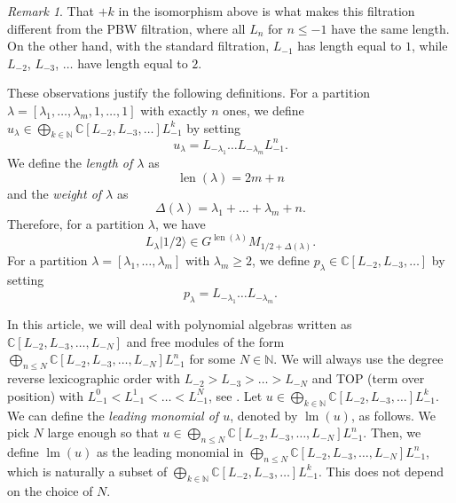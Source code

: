 \documentclass[a4paper, 12pt, reqno]{amsart}
\theoremstyle{remark}
\newtheorem{remark}[theorem]{Remark}
\DeclareMathOperator{\lm}{lm}
\DeclareMathOperator{\len}{len}
\newcommand{\vachalf}{{|1/2\rangle}}
\begin{document}
\begin{remark}
  \label{rmk:4}
  That $+k$ in the isomorphism above is what makes this filtration different from the PBW filtration, where all $L_n$ for $n \le -1$ have the same length.
  On the other hand, with the standard filtration, $L_{-1}$ has length equal to $1$, while $L_{-2}$, $L_{-3}$, $\dots$ have length equal to $2$.
\end{remark}

These observations justify the following definitions.
For a partition $\lambda = [\lambda_1, \dots, \lambda_m, 1, \dots, 1]$ with exactly $n$ ones, we define $u_{\lambda} \in \bigoplus_{k \in \mathbb{N}}\mathbb{C}[L_{-2}, L_{-3}, \dots]L_{-1}^k$ by setting
\begin{equation*}
  u_{\lambda} = L_{-\lambda_1}\dots L_{-\lambda_m}L_{-1}^n.
\end{equation*}
We define the \emph{length of $\lambda$} as
\begin{equation*}
  \len(\lambda) = 2m + n
\end{equation*}
and the \emph{weight of $\lambda$} as
\begin{equation*}
  \Delta(\lambda) = \lambda_1 + \dots + \lambda_m + n.
\end{equation*}
Therefore, for a partition $\lambda$, we have
\begin{equation*}
  L_{\lambda}\vachalf \in G^{\len(\lambda)}M_{1/2 + \Delta(\lambda)}.
\end{equation*}
For a partition $\lambda = [\lambda_1, \dots, \lambda_m]$ with $\lambda_m \ge 2$, we define $p_{\lambda} \in \mathbb{C}[L_{-2}, L_{-3}, \dots]$ by setting
\begin{equation*}
  p_{\lambda} = L_{-\lambda_1}\dots L_{-\lambda_m}.
\end{equation*}

In this article, we will deal with polynomial algebras written as $\mathbb{C}[L_{-2}, L_{-3}, \dots, L_{-N}]$ and free modules of the form $\bigoplus_{n \le N}\mathbb{C}[L_{-2}, L_{-3}, \dots, L_{-N}]L_{-1}^n$ for some $N \in \mathbb{N}$.
We will always use the degree reverse lexicographic order with $L_{-2} > L_{-3} > \dots > L_{-N}$ and TOP (term over position) with $L_{-1}^0 < L_{-1}^1 < \dots < L_{-1}^N$, see \cite[\S3.5]{adams_introduction_1994}.
Let $u \in \bigoplus_{k \in \mathbb{N}}\mathbb{C}[L_{-2}, L_{-3}, \dots]L_{-1}^k$.
We can define the \emph{leading monomial of $u$}, denoted by $\lm(u)$, as follows.
We pick $N$ large enough so that $u \in \bigoplus_{n \le N}\mathbb{C}[L_{-2}, L_{-3}, \dots, L_{-N}]L_{-1}^n$.
Then, we define $\lm(u)$ as the leading monomial in $\bigoplus_{n \le N}\mathbb{C}[L_{-2}, L_{-3}, \dots, L_{-N}]L_{-1}^n$, which is naturally a subset of $\bigoplus_{k \in \mathbb{N}}\mathbb{C}[L_{-2}, L_{-3}, \dots]L_{-1}^k$.
This does not depend on the choice of $N$.
\end{document}
